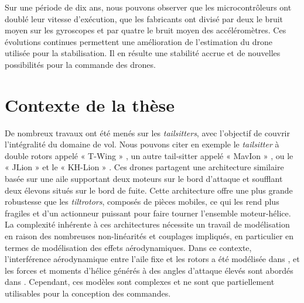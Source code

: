 Sur une période de dix ans, nous pouvons observer que les microcontrôleurs ont doublé leur vitesse d'exécution, que les fabricants ont divisé par deux le bruit moyen sur les gyroscopes et par quatre le bruit moyen des accéléromètres.
Ces évolutions continues permettent une amélioration de l'estimation du drone utilisée pour la stabilisation. Il en résulte une stabilité accrue et de nouvelles possibilités pour la commande des drones.


\section{Contexte de la thèse}


De nombreux travaux ont été menés sur les \textit{tailsitters}, avec l'objectif de couvrir l'intégralité du domaine de vol. 
Nous pouvons citer en exemple le \textit{tailsitter} à double rotors appelé « T-Wing » \cite{Stone2002PreliminaryDO, TWing2008}, un autre tail-sitter appelé « MavIon » \cite{oatao14575}, ou le « JLion » et le « KH-Lion » \cite{8003167}. Ces drones partagent une architecture similaire basée sur une aile supportant deux moteurs sur le bord d'attaque et soufflant deux élevons situés sur le bord de fuite. Cette architecture offre une plus grande robustesse que les \textit{tiltrotors}, composés de pièces mobiles, ce qui les rend plus fragiles et d'un actionneur puissant pour faire tourner l'ensemble moteur-hélice.
La complexité inhérente à ces architectures nécessite un travail de modélisation en raison des nombreuses non-linéarités et couplages impliqués, en particulier en termes de modélisation des effets aérodynamiques. Dans ce contexte, l'interférence aérodynamique entre l'aile fixe et les rotors a été modélisée dans \cite{droandi_zanotti_gibertini_grassi_campanardi_2015, Simmons2022, aerospace5030079}, et les forces et moments d'hélice générés à des angles d'attaque élevés sont abordés dans \cite{Fernandez2023}. Cependant, ces modèles sont complexes et ne sont que partiellement utilisables pour la conception des commandes. 

